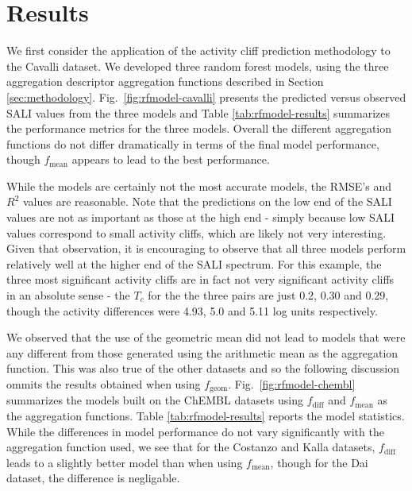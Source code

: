 \documentclass[letterpaper, 12pt]{article}
\begin{document}
\section{Results}
\label{sec:applications}
We first consider the application of the activity cliff prediction
methodology to the Cavalli dataset. We developed three random forest
models, using the three aggregation descriptor aggregation functions
described in Section
\ref{sec:methodology}. Fig.~\ref{fig:rfmodel-cavalli} presents the
predicted versus observed SALI values from the three models and Table
\ref{tab:rfmodel-results} summarizes the performance metrics for the
three models. Overall the different aggregation functions do not
differ dramatically in terms of the final model performance, though
$f_{\textrm{mean}}$ appears to lead to the best performance. 

While the models are certainly not the most accurate models, the
RMSE's and $R^2$ values are reasonable. Note that the predictions on
the low end of the SALI values are not as important as those at the
high end - simply because low SALI values correspond to small activity
cliffs, which are likely not very interesting. Given that observation,
it is encouraging to observe that all three models perform relatively
well at the higher end of the SALI spectrum. For this example, the
three most significant activity cliffs are in fact not very
significant activity cliffs in an absolute sense - the $T_c$ for the
the three pairs are just 0.2, 0.30 and 0.29, though the activity
differences were 4.93, 5.0 and 5.11 log units respectively.

We observed that the use of the geometric mean did not lead to models
that were any different from those generated using the arithmetic mean
as the aggregation function. This was also true of the other datasets
and so the following discussion ommits the results obtained when using
$f_{\textrm{geom}}$. Fig.~\ref{fig:rfmodel-chembl} summarizes the
models built on the ChEMBL datasets using $f_{\textrm{diff}}$ and
$f_{\textrm{mean}}$ as the aggregation functions. Table
\ref{tab:rfmodel-results} reports the model statistics.  While the
differences in model performance do not vary significantly with the
aggregation function used, we see that for the Costanzo and Kalla
datasets, $f_{\textrm{diff}}$ leads to a slightly better model than
when using $f_{\textrm{mean}}$, though for the Dai dataset, the
difference is negligable.
\end{document}
